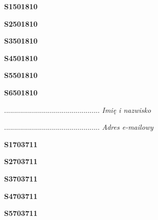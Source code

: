 \begin{turn}{90}\huge \textbf{S1501810}\end{turn}

\begin{turn}{90}\huge \textbf{S2501810}\end{turn}

\begin{turn}{90}\huge \textbf{S3501810}\end{turn}

\begin{turn}{90}\huge \textbf{S4501810}\end{turn}

\begin{turn}{90}\huge \textbf{S5501810}\end{turn}

\begin{turn}{90}\huge \textbf{S6501810}\end{turn}

\begin{turn}{90}\begin{minipage}{\linewidth} \vspace{20mm} ................................................  \textit{Imię i nazwisko}\end{minipage}\end{turn}

\begin{turn}{90}\begin{minipage}{\linewidth} \vspace{20mm} ................................................  \textit{Adres e-mailowy}\end{minipage}\end{turn}

\begin{turn}{90}\huge \textbf{S1703711}\end{turn}

\begin{turn}{90}\huge \textbf{S2703711}\end{turn}

\begin{turn}{90}\huge \textbf{S3703711}\end{turn}

\begin{turn}{90}\huge \textbf{S4703711}\end{turn}

\begin{turn}{90}\huge \textbf{S5703711}\end{turn}

